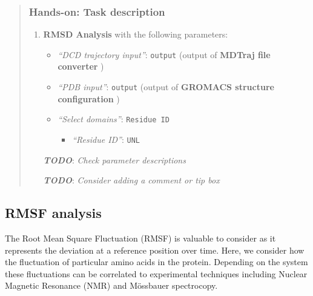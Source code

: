 \documentclass[twocolumn]{bmcart}%
\providecommand{\tightlist}{%
  \setlength{\itemsep}{0pt}\setlength{\parskip}{0pt}}
\providecommand{\tightlist}{%
  \setlength{\itemsep}{0pt}\setlength{\parskip}{0pt}}
\begin{document}
\begin{quote}
\hypertarget{hands-on-task-description-11}{%
\subsubsection{Hands-on: Task
description}\label{hands-on-task-description-11}}

\begin{enumerate}
\def\labelenumi{\arabic{enumi}.}
\tightlist
\item
  \textbf{RMSD Analysis} with the following parameters:

  \begin{itemize}
  \tightlist
  \item
    \emph{``DCD trajectory input''}: \texttt{output} (output of
    \textbf{MDTraj file converter} )
  \item
    \emph{``PDB input''}: \texttt{output} (output of \textbf{GROMACS
    structure configuration} )
  \item
    \emph{``Select domains''}: \texttt{Residue\ ID}

    \begin{itemize}
    \tightlist
    \item
      \emph{``Residue ID''}: \texttt{UNL}
    \end{itemize}
  \end{itemize}

  \textbf{\emph{TODO}}: \emph{Check parameter descriptions}

  \textbf{\emph{TODO}}: \emph{Consider adding a comment or tip box}
\end{enumerate}


\end{quote}



\hypertarget{rmsf-analysis}{%
\subsection{RMSF analysis}\label{rmsf-analysis}}

The Root Mean Square Fluctuation (RMSF) is valuable to consider as it represents the deviation at a reference position over time. Here, we consider how the fluctuation of particular amino acids in the protein. Depending on the system these fluctuations can be correlated to experimental techniques including Nuclear Magnetic Resonance (NMR) and M\"{o}ssbauer spectrocopy.
\end{document}
